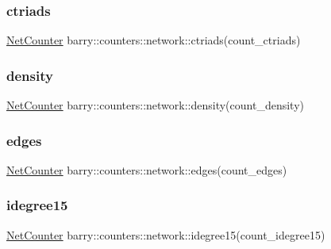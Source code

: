 \subsubsection{\texorpdfstring{ctriads}{ctriads}}
{\footnotesize\ttfamily \hyperlink{namespacebarry_1_1counters_1_1network_a2d14cbc0a77bfba218df85a750bfeb84}{Net\+Counter} barry\+::counters\+::network\+::ctriads(count\+\_\+ctriads)}

\mbox{\label{namespacebarry_1_1counters_1_1network_aa15d84663778df2b26161a2812cbd4c6}} 
\subsubsection{\texorpdfstring{density}{density}}
{\footnotesize\ttfamily \hyperlink{namespacebarry_1_1counters_1_1network_a2d14cbc0a77bfba218df85a750bfeb84}{Net\+Counter} barry\+::counters\+::network\+::density(count\+\_\+density)}

\mbox{\label{namespacebarry_1_1counters_1_1network_a025eda0612c21b33ce59299b107845cb}} 
\subsubsection{\texorpdfstring{edges}{edges}}
{\footnotesize\ttfamily \hyperlink{namespacebarry_1_1counters_1_1network_a2d14cbc0a77bfba218df85a750bfeb84}{Net\+Counter} barry\+::counters\+::network\+::edges(count\+\_\+edges)}

\mbox{\label{namespacebarry_1_1counters_1_1network_ab0e6bdd119e291f67a6f94dd715391f5}} 
\subsubsection{\texorpdfstring{idegree15}{idegree15}}
{\footnotesize\ttfamily \hyperlink{namespacebarry_1_1counters_1_1network_a2d14cbc0a77bfba218df85a750bfeb84}{Net\+Counter} barry\+::counters\+::network\+::idegree15(count\+\_\+idegree15)}

